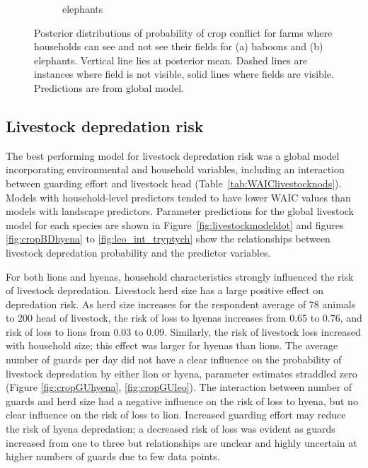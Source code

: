 \documentclass[12pt,]{article}
\begin{document}
\begin{figure}[H]
\begin{subfigure}[b]{0.49\textwidth}
    \caption{elephants}
  	\label{fig:cropSEEele}
\end{subfigure}
\caption{Posterior distributions of probability of crop conflict for farms where households can see and not see their fields for (a) baboons and (b) elephants. Vertical line lies at posterior mean. Dashed lines are instances where field is not visible, solid lines where fields are visible. Predictions are from global model.}
\end{figure}


\subsection{Livestock depredation risk}

The best performing model for livestock depredation risk was a global model incorporating environmental and household variables, including an interaction between guarding effort and livestock head (Table~\ref{tab:WAIClivestocknods}). Models with household-level predictors tended to have lower WAIC values than models with landscape predictors. Parameter predictions for the global livestock model for each species are shown in Figure~\ref{fig:livestockmodeldot} and figures \ref{fig:cropBDhyena} to \ref{fig:leo_int_tryptych} show the relationships between livestock depredation probability and the predictor variables.

For both lions and hyenas, household characteristics strongly influenced the risk of livestock depredation. Livestock herd size has a large positive effect on depredation risk. As herd size increases for the respondent average of 78 animals to 200 head of livestock, the risk of loss to hyenas increases from 0.65 to 0.76, and risk of loss to lions from 0.03 to 0.09. Similarly, the risk of livestock loss increased with household size; this effect was larger for hyenas than lions. The average number of guards per day did not have a clear influence on the probability of livestock depredation by either lion or hyena, parameter estimates straddled zero (Figure \ref{fig:cropGUhyena}, \ref{fig:cropGUleo}). The interaction between number of guards and herd size had a negative influence on the risk of loss to hyena, but no clear influence on the risk of loss to lion. Increased guarding effort may reduce the risk of hyena depredation; a decreased risk of loss was evident as guards increased from one to three but relationships are unclear and highly uncertain at higher numbers of guards due to few data points.
\end{document}
